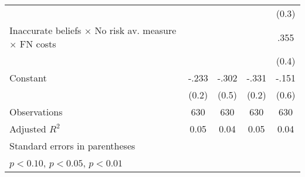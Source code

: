 \begin{table}[htbp]
\begin{tabular}{l*{4}{c}}
                &                  &                  &                  &    (0.3)         \\
Inaccurate beliefs $\times$ No risk av. measure $\times$ FN costs&                  &                  &                  &     .355         \\
                &                  &                  &                  &    (0.4)         \\
Constant        &    -.233         &    -.302         &    -.331         &    -.151         \\
                &    (0.2)         &    (0.5)         &    (0.2)         &    (0.6)         \\
\hline
Observations    &      630         &      630         &      630         &      630         \\
Adjusted \(R^{2}\)&     0.05         &     0.04         &     0.05         &     0.04         \\
\hline\hline
\multicolumn{5}{l}{\footnotesize Standard errors in parentheses}\\
\multicolumn{5}{l}{\footnotesize \sym{*} \(p<0.10\), \sym{**} \(p<0.05\), \sym{***} \(p<0.01\)}\\
\end{tabular}
\end{table}
